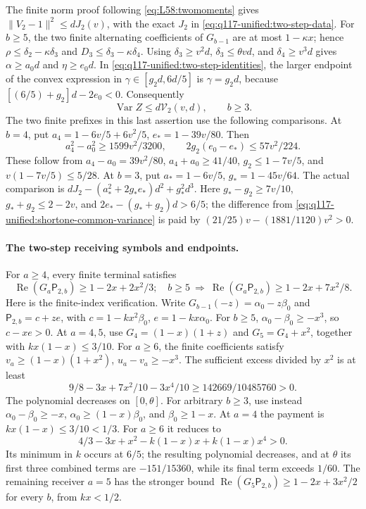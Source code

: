 The finite norm proof following \eqref{eq:L58:twomoments} gives
\(\|V_2-1\|^2\le dJ_2(v)\), with the exact \(J_2\) in
\eqref{eq:q117-unified:two-step-data}. For \(b\ge5\), the two
finite alternating coefficients of \(G_{b-1}\) are at most
\(1-\kappa x\); hence
\(\rho\le\delta_2-\kappa\delta_3\) and
\(D_3\le\delta_3-\kappa\delta_4\).
Using \(\delta_3\ge v^2d\), \(\delta_3\le\theta vd\),
and \(\delta_4\ge v^3d\) gives
\(\alpha\ge a_0d\) and \(\eta\ge e_0d\).
In \eqref{eq:q117-unified:two-step-identities}, the larger endpoint
of the convex expression in \(\gamma\in[g_2d,6d/5]\) is
\(\gamma=g_2d\), because
\([(6/5)+g_2]d-2e_0<0\). Consequently
\begin{equation}\label{eq:q117-unified:shortone-common-variance}
 \operatorname{Var}Z\le d\mathcal V_2(v,d),\qquad b\ge3.
\end{equation}
The two finite prefixes in this last assertion
use the following comparisons. At \(b=4\), put
\(a_4=1-6v/5+6v^2/5\), \(e_*=1-39v/80\). Then
\[
 a_4^2-a_0^2\ge1599v^2/3200,
 \qquad2g_2(e_0-e_*)\le57v^2/224.
\]
These follow from \(a_4-a_0=39v^2/80\),
\(a_4+a_0\ge41/40\), \(g_2\le1-7v/5\), and
\(v(1-7v/5)\le5/28\). At \(b=3\), put
\(a_*=1-6v/5\), \(g_*=1-45v/64\). The actual comparison is
\(dJ_2-(a_*^2+2g_*e_*)d^2+g_*^2d^3\).
Here \(g_*-g_2\ge7v/10\), \(g_*+g_2\le2-2v\), and
\(2e_*-(g_*+g_2)d>6/5\); the difference from
\eqref{eq:q117-unified:shortone-common-variance} is paid by
\((21/25)v-(1881/1120)v^2>0\).

\paragraph{The two-step receiving symbols and endpoints.}
For \(a\ge4\), every finite terminal satisfies
\[
 \operatorname{Re}(G_a\mathsf P_{2,b})\ge1-2x+2x^2/3;
 \quad b\ge5\ \Longrightarrow\
 \operatorname{Re}(G_a\mathsf P_{2,b})\ge1-2x+7x^2/8.
\]
Here is the finite-index verification. Write
\(G_{b-1}(-z)=\alpha_0-z\beta_0\) and
\(\mathsf P_{2,b}=c+ze\), with
\(c=1-kx^2\beta_0\), \(e=1-kx\alpha_0\).
For \(b\ge5\), \(\alpha_0-\beta_0\ge-x^3\), so
\(c-xe>0\). At \(a=4,5\), use
\(G_4=(1-x)(1+z)\) and \(G_5=G_4+x^2\), together with
\(kx(1-x)\le3/10\). For \(a\ge6\), the finite coefficients
satisfy \(v_a\ge(1-x)(1+x^2)\), \(u_a-v_a\ge-x^3\).
The sufficient excess divided by \(x^2\) is at least
\[
 9/8-3x+7x^2/10-3x^4/10
 \ge142669/10485760>0.
\]
The polynomial decreases on \([0,\theta]\).
For arbitrary \(b\ge3\), use instead
\(\alpha_0-\beta_0\ge-x\),
\(\alpha_0\ge(1-x)\beta_0\), and \(\beta_0\ge1-x\).
At \(a=4\) the payment is \(kx(1-x)\le3/10<1/3\).
For \(a\ge6\) it reduces to
\[
 4/3-3x+x^2-k(1-x)x+k(1-x)x^4>0.
\]
Its minimum in \(k\) occurs at \(6/5\); the resulting polynomial
decreases, and at \(\theta\) its first three combined terms are
\(-151/15360\), while its final term exceeds \(1/60\).
The remaining receiver \(a=5\) has the stronger bound
\(\operatorname{Re}(G_5\mathsf P_{2,b})\ge1-2x+3x^2/2\)
for every \(b\), from \(kx<1/2\).


